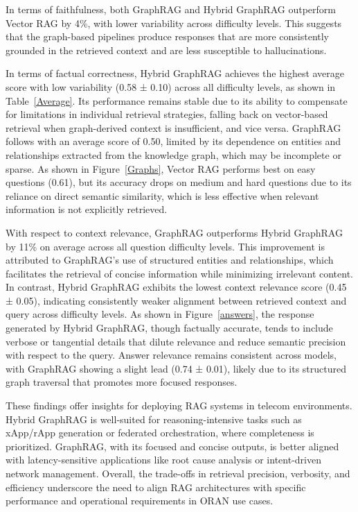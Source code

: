 \documentclass[10pt, conference]{IEEEtran}
\begin{document}
In terms of faithfulness, both GraphRAG and Hybrid GraphRAG outperform Vector RAG by 4\%, with lower variability across difficulty levels. This suggests that the graph-based pipelines produce responses that are more consistently grounded in the retrieved context and are less susceptible to hallucinations.

In terms of factual correctness, Hybrid GraphRAG achieves the highest average score with low variability (0.58 ± 0.10) across all difficulty levels, as shown in Table~\ref{Average}. Its performance remains stable due to its ability to compensate for limitations in individual retrieval strategies, falling back on vector-based retrieval when graph-derived context is insufficient, and vice versa. GraphRAG follows with an average score of 0.50, limited by its dependence on entities and relationships extracted from the knowledge graph, which may be incomplete or sparse. As shown in Figure~\ref{Graphs}, Vector RAG performs best on easy questions (0.61), but its accuracy drops on medium and hard questions due to its reliance on direct semantic similarity, which is less effective when relevant information is not explicitly retrieved.

With respect to context relevance, GraphRAG outperforms Hybrid GraphRAG by 11\% on average across all question difficulty levels. This improvement is attributed to GraphRAG’s use of structured entities and relationships, which facilitates the retrieval of concise information while minimizing irrelevant content. In contrast, Hybrid GraphRAG exhibits the lowest context relevance score (0.45 ± 0.05), indicating consistently weaker alignment between retrieved context and query across difficulty levels. As shown in Figure~\ref{answers}, the response generated by Hybrid GraphRAG, though factually accurate, tends to include verbose or tangential details that dilute relevance and reduce semantic precision with respect to the query. Answer relevance remains consistent across models, with GraphRAG showing a slight lead (0.74 ± 0.01), likely due to its structured graph traversal that promotes more focused responses.

These findings offer insights for deploying RAG systems in telecom environments. Hybrid GraphRAG is well-suited for reasoning-intensive tasks such as xApp/rApp generation or federated orchestration, where completeness is prioritized. GraphRAG, with its focused and concise outputs, is better aligned with latency-sensitive applications like root cause analysis or intent-driven network management. Overall, the trade-offs in retrieval precision, verbosity, and efficiency underscore the need to align RAG architectures with specific performance and operational requirements in ORAN use cases.
\end{document}
